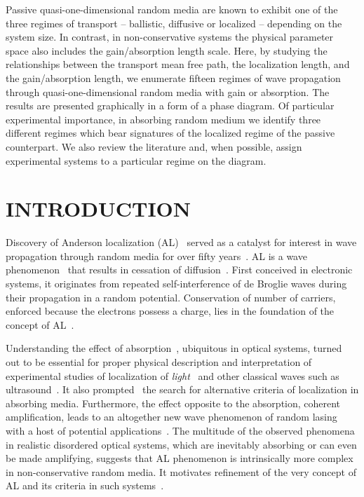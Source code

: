 Passive quasi-one-dimensional random media are known to exhibit one of the three regimes of transport -- ballistic, diffusive or localized --  depending on the system size. In contrast, in non-conservative systems the physical parameter space also includes the gain/absorption length scale. Here, by studying the relationships between the transport mean free path, the localization length, and the gain/absorption length, we enumerate fifteen regimes of wave propagation through quasi-one-dimensional random media with gain or absorption. The results are presented graphically in a form of a phase diagram. Of particular experimental importance, in absorbing random medium we identify three different regimes which bear signatures of the localized regime of the passive counterpart. We also review the literature and, when possible, assign experimental systems to a particular regime on the diagram. 

\section{INTRODUCTION}
\label{sec:introduction}

Discovery of Anderson localization (AL)~\cite{1958_Anderson} served as a catalyst for interest in wave propagation through random media for over fifty years~\cite{2009_Lagendijk_PT}. AL is a wave phenomenon~\cite{2007_Akkermans_book} that results in cessation of diffusion~\cite{2010_Wolfle}. First conceived in electronic systems, it originates from  repeated self-interference of de Broglie waves during their propagation in a random potential. Conservation of number of carriers, enforced because the electrons possess a charge, lies in the foundation of the concept of AL~\cite{1991_Altshuler}. 

Understanding the effect of absorption~\cite{1984_John_prl}, ubiquitous in optical systems, turned out to be essential for proper physical description and interpretation of experimental studies of localization of {\it light}~\cite{1989_Genack,1997_wiersma_nature,1999_Maret,2000_chabanov_nature,2007_Maret,2007_Segev} and other classical waves such as ultrasound~\cite{2008_van_Tiggelen_Nature,2008_Weaver}. It also prompted~\cite{2000_chabanov_nature} the search for alternative criteria of localization in absorbing media. Furthermore, the effect opposite to the absorption, coherent amplification, leads to an altogether new wave phenomenon of random lasing with a host of potential applications~\cite{2005_Cao,2008_Wiersma}. The multitude of the observed phenomena in realistic disordered optical systems, which are inevitably absorbing or can even be made amplifying, suggests that AL phenomenon is intrinsically more complex in non-conservative random media. It motivates refinement of the very concept of AL and its criteria in such systems~\cite{2010_Payne_loc_criterion}.

